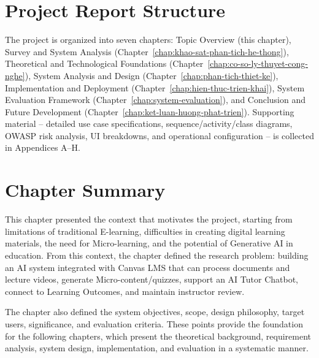 \section{Project Report Structure}

The project is organized into seven chapters: Topic Overview (this
chapter), Survey and System Analysis
(Chapter~\ref{chap:khao-sat-phan-tich-he-thong}), Theoretical and
Technological Foundations
(Chapter~\ref{chap:co-so-ly-thuyet-cong-nghe}), System Analysis and
Design (Chapter~\ref{chap:phan-tich-thiet-ke}), Implementation and
Deployment (Chapter~\ref{chap:hien-thuc-trien-khai}), System
Evaluation Framework (Chapter~\ref{chap:system-evaluation}), and
Conclusion and Future Development
(Chapter~\ref{chap:ket-luan-huong-phat-trien}). Supporting material --
detailed use case specifications, sequence/activity/class diagrams,
OWASP risk analysis, UI breakdowns, and operational configuration --
is collected in Appendices A--H.

\section{Chapter Summary}

This chapter presented the context that motivates the project, starting from
limitations of traditional E-learning, difficulties in creating digital
learning materials, the need for Micro-learning, and the potential of
Generative AI in education. From this context, the chapter defined the research
problem: building an AI system integrated with Canvas LMS that can process
documents and lecture videos, generate Micro-content/quizzes, support an AI
Tutor Chatbot, connect to Learning Outcomes, and maintain instructor review.

The chapter also defined the system objectives, scope, design philosophy,
target users, significance, and evaluation criteria. These points provide the
foundation for the following chapters, which present the theoretical
background, requirement analysis, system design, implementation, and evaluation
in a systematic manner.
